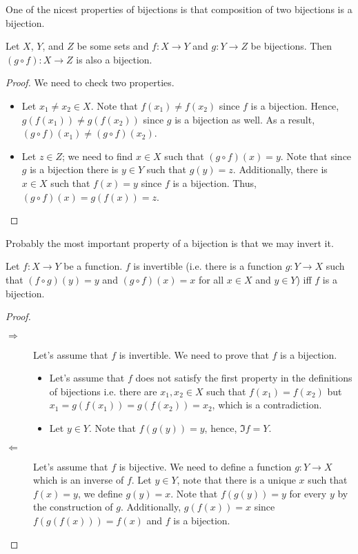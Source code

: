 One of the nicest properties of bijections is that composition of two bijections
is a bijection.
\begin{theorem}
\label{theorem:bijections-composition}
  Let $X$, $Y$, and $Z$ be some sets and $f : X \to Y$ and $g : Y \to Z$ be
  bijections. Then $(g \circ f) : X \to Z$ is also a bijection.
\end{theorem}
\begin{proof}
  We need to check two properties.
  \begin{itemize}
    \item Let $x_1 \neq x_2 \in X$. Note that $f(x_1) \neq f(x_2)$ since $f$
      is a bijection. Hence, $g(f(x_1)) \neq g(f(x_2))$ since $g$ is a bijection
      as well. As a result, $(g \circ f)(x_1) \neq (g \circ f)(x_2)$.
    \item Let $z \in Z$; we need to find $x \in X$ such that
      $(g \circ f)(x) = y$. Note that since $g$ is a bijection there is
      $y \in Y$ such that $g(y) = z$. Additionally, there is $x \in X$ such
      that $f(x) = y$ since $f$ is a bijection. Thus,
      $(g \circ f)(x) = g(f(x)) = z$.
  \end{itemize}
\end{proof}

Probably the most important property of a bijection is that we may invert it.
\begin{theorem}
\label{theorem:inverse-of-bijections}
  Let $f : X \to Y$ be a function. $f$ is invertible (i.e. there is a function
  $g : Y \to X$ such that $(f \circ g)(y) = y$ and $(g \circ f)(x) = x$ for all
  $x \in X$ and $y \in Y$) iff $f$ is a bijection.
\end{theorem}
\begin{proof}
  \begin{description}
    \item[$\Rightarrow$] Let's assume that $f$ is invertible. We need to prove
      that $f$ is a bijection.
      \begin{itemize}
        \item Let's assume that $f$ does not satisfy the first property in the
          definitions of bijections i.e. there are
          $x_1, x_2 \in X$ such that $f(x_1) = f(x_2)$ but $x_1 = g(f(x_1)) =
          g(f(x_2)) = x_2$, which is a contradiction.
        \item Let $y \in Y$. Note that $f(g(y)) = y$, hence, $\Im f = Y$.
      \end{itemize}

    \item[$\Leftarrow$] Let's assume that $f$ is bijective. We need to define a
      function $g : Y \to X$ which is an inverse of $f$. Let $y \in Y$, note
      that there is a unique $x$ such that $f(x) = y$, we define $g(y) = x$.
      Note that $f(g(y)) = y$ for every $y$ by the construction of $g$.
      Additionally, $g(f(x)) = x$ since $f(g(f(x))) = f(x)$ and $f$ is a
      bijection.
  \end{description}
\end{proof}

